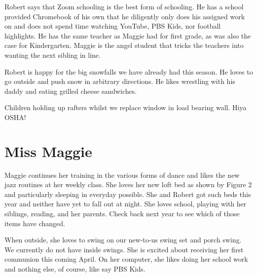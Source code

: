 \documentclass[letterpaper,11pt]{article}
\makeatletter
\newenvironment{figurehere}
  {\def\@captype{figure}}
  {}
\makeatother
\begin{document}
\begin{multicols}{2}
Robert says that Zoom schooling is the best form of schooling.  He has a school provided Chromebook
of his own that he diligently only does his assigned work on and does not spend
time watching YouTube, PBS Kids, nor football highlights. He has the same teacher as
Maggie had for first grade, as was also the case for Kindergarten.  Maggie is the angel
student that tricks the teachers into wanting the next sibling in line.

Robert is happy for the big snowfalls we have already had this season.  He loves
to go outside and push snow in arbitrary directions. He likes wrestling with his
daddy and eating grilled cheese sandwiches.

\bigskip

\begin{figurehere}
    \centering   
    \caption{Children holding up rafters whilst we replace window in load 
    bearing wall. Hiya OSHA!}
   \end{figurehere}

\section{Miss Maggie}

Maggie continues her training in the various forms of dance and likes the new
jazz routines at her weekly class.  She loves her new loft bed as shown by
Figure 2 and particularly sleeping in everyday possible.  She and Robert got 
such beds this year and neither have yet to fall out at night.  She loves school,
playing with her siblings, reading, and her parents.  Check back next year to see which 
of those items have changed.

When outside, she loves to swing on our new-to-us swing set and porch swing. We
currently do not have inside swings.  She is excited about receiving her
first communion this coming April.  On her computer, she likes doing her school
work and nothing else, of course, like say PBS Kids.


\end{multicols}
\end{document}

